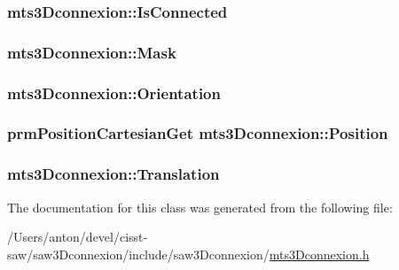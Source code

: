 \subsubsection[{Is\+Connected}]{ mts3\+Dconnexion\+::\+Is\+Connected\hspace{0.3cm}{\ttfamily [protected]}}\label{classmts3_dconnexion_a7242b5dd56fed7c290e054fe129e2c00}
\hypertarget{classmts3_dconnexion_a9aa79512dbed22a9c69d56ec7e757791}{}
\subsubsection[{Mask}]{ mts3\+Dconnexion\+::\+Mask\hspace{0.3cm}{\ttfamily [protected]}}\label{classmts3_dconnexion_a9aa79512dbed22a9c69d56ec7e757791}
\hypertarget{classmts3_dconnexion_afff4aa6e11a99251eaf021e9bba2047c}{}
\subsubsection[{Orientation}]{ mts3\+Dconnexion\+::\+Orientation\hspace{0.3cm}{\ttfamily [protected]}}\label{classmts3_dconnexion_afff4aa6e11a99251eaf021e9bba2047c}
\hypertarget{classmts3_dconnexion_a18477fb46941bead7c9c998aa4f64cae}{}
\subsubsection[{Position}]{\setlength{\rightskip}{0pt plus 5cm}prm\+Position\+Cartesian\+Get mts3\+Dconnexion\+::\+Position\hspace{0.3cm}{\ttfamily [protected]}}\label{classmts3_dconnexion_a18477fb46941bead7c9c998aa4f64cae}
\hypertarget{classmts3_dconnexion_a8e84db133cf3e6f2624b231a05e049bf}{}
\subsubsection[{Translation}]{ mts3\+Dconnexion\+::\+Translation\hspace{0.3cm}{\ttfamily [protected]}}\label{classmts3_dconnexion_a8e84db133cf3e6f2624b231a05e049bf}


The documentation for this class was generated from the following file\+:\begin{DoxyCompactItemize}
\item 
/\+Users/anton/devel/cisst-\/saw/saw3\+Dconnexion/include/saw3\+Dconnexion/\hyperlink{mts3_dconnexion_8h}{mts3\+Dconnexion.\+h}\end{DoxyCompactItemize}
